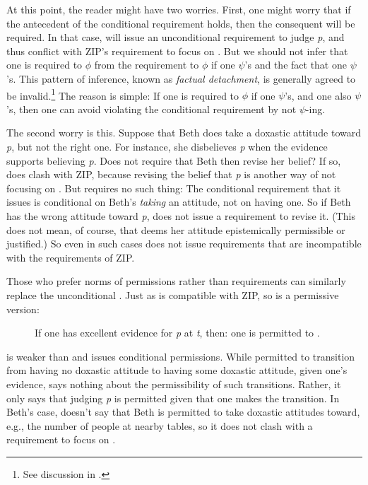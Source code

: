 \documentclass[12pt]{article}
\begin{document}
At this point, the reader might have two worries. First, one might worry that if the antecedent of the conditional requirement holds, then the consequent will be required. In that case, \eoc{} will issue an unconditional requirement to judge \textit{p}, and thus conflict with ZIP's requirement to focus on . But we should not infer that one is required to $\phi$ from the requirement to $\phi$ if one $\psi$'s and the fact that one $\psi$'s. This pattern of inference, known as \textit{factual detachment}, is generally agreed to be invalid.\footnote{See discussion in \textcite[\S 3.1]{kiesewetter_normativity_2017}.} The reason is simple: If one is required to $\phi$ if one $\psi$'s, and one also $\psi$'s, then one can avoid violating the conditional requirement by not $\psi$-ing.


The second worry is this. Suppose that Beth does take a doxastic attitude toward \textit{p}, but not the right one. For instance, she disbelieves \textit{p} when the evidence supports believing \textit{p}. Does \eoc{} not require that Beth then revise her belief? If so, \eoc{} does clash with ZIP, because revising the belief that \textit{p} is another way of not focusing on . But \eoc{} requires no such thing: The conditional requirement that it issues is conditional on Beth's \textit{taking} an attitude, not on having one. So if Beth has the wrong attitude toward \textit{p}, \eoc{} does not issue a requirement to revise it. (This does not mean, of course, that \eoc{} deems her attitude epistemically permissible or justified.) So even in such cases \eoc{} does not issue requirements that are incompatible with the requirements of ZIP.

Those who prefer norms of permissions rather than requirements can similarly replace the unconditional \ep{}. Just as \eoc{} is compatible with ZIP, so is a permissive version:

\begin{description}
    \item[\epc] If one has excellent evidence for \textit{p} at \textit{t}, then: one is permitted to \judif{}.
\end{description}
%
\epc{} is weaker than \ep{} and issues conditional permissions. While \ep{} permitted to transition from having no doxastic attitude to having some doxastic attitude, given one's evidence, \epc{} says nothing about the permissibility of such transitions. Rather, it only says that judging \textit{p} is permitted given that one makes the transition. In Beth's case, \epc{} doesn't say that Beth is permitted to take doxastic attitudes toward, e.g., the number of people at nearby tables, so it does not clash with a requirement to focus on .
\end{document}
